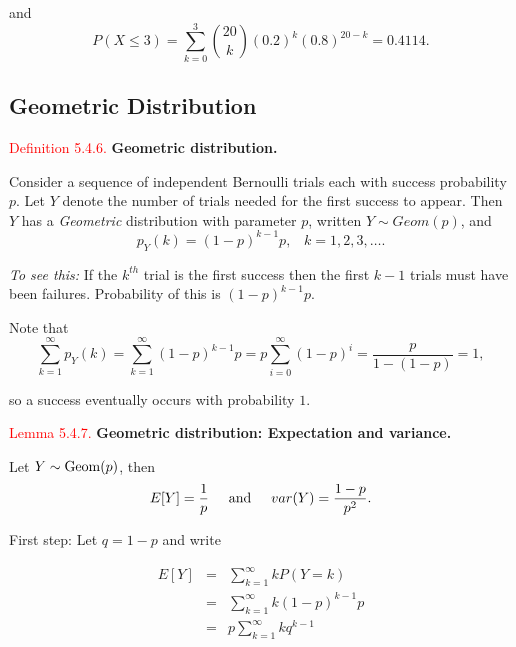 \documentclass[
]{book}
\begin{document}
and\\

\[
P(X \leq 3) = \sum_{k=0}^{3} \binom{20}{k} (0.2)^{k}(0.8)^{20-k} = 0.4114.
\]

\hypertarget{rv:Bernoulli:geom}{%
\subsection{Geometric Distribution}\label{rv:Bernoulli:geom}}

\leavevmode{}%
\textcolor{red}{Definition 5.4.6.}
{\textbf{Geometric distribution.}}

Consider a sequence of independent Bernoulli trials each with success probability \(p\). Let \(Y\) denote the number of trials needed for the first success to appear. Then \(Y\) has a \emph{Geometric} distribution with parameter \(p\), written \(Y \sim Geom(p)\), and\\

\[
p_Y (k) = (1-p)^{k-1}p, \; \; \; k = 1, 2, 3, \ldots .
\]

\emph{To see this:} If the \(k^{th}\) trial is the first success then the first \(k-1\) trials must have
been failures. Probability of this is \((1-p)^{k-1}p\).

Note that\\

\[
\sum_{k=1}^\infty p_Y (k)=\sum_{k=1}^\infty (1-p)^{k-1}p=p\sum_{i=0}^\infty (1-p)^i=\frac{p}{1-(1-p)}=1,
\]

so a success eventually occurs with probability \(1\).

\leavevmode{}%
\textcolor{red}{Lemma 5.4.7.}
{\textbf{Geometric distribution: Expectation and variance.}}

Let \(Y \sim {\rm Geom} (p)\), then\\

\[ E[Y]= \frac{1}{p} \hspace{0.5cm} \mbox{and} \hspace{0.5cm} var(Y) = \frac{1-p}{p^2}. \]

First step: Let \(q=1-p\) and write

\begin{eqnarray*}
E[Y] & = & \sum_{k=1}^{\infty} k P(Y=k) \\ & = & \sum_{k=1}^{\infty} k (1-p)^{k-1}p \\
 & = & p \sum_{k=1}^{\infty} k q^{k-1} \end{eqnarray*}
\end{document}
